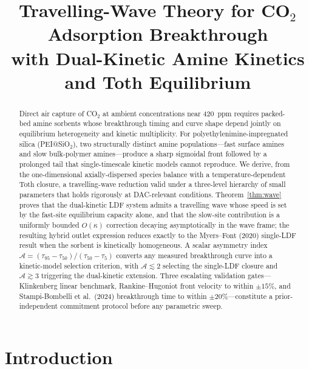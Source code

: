 \documentclass[a4paper]{amsart}
\theoremstyle{definition}
\begin{document}
\title{Travelling-Wave Theory for CO$_2$ Adsorption Breakthrough\\
with Dual-Kinetic Amine Kinetics and Toth Equilibrium}

\date{}
\maketitle

\begin{abstract}
Direct air capture of CO$_2$ at ambient concentrations near 420~ppm requires
packed-bed amine sorbents whose breakthrough timing and curve shape depend
jointly on equilibrium heterogeneity and kinetic multiplicity.
For polyethylenimine-impregnated silica (PEI@SiO$_2$), two structurally
distinct amine populations---fast surface amines and slow bulk-polymer
amines---produce a sharp sigmoidal front followed by a prolonged tail that
single-timescale kinetic models cannot reproduce.
We derive, from the one-dimensional axially-dispersed species balance with a
temperature-dependent Toth closure, a travelling-wave reduction valid under a
three-level hierarchy of small parameters that holds rigorously at
DAC-relevant conditions.
Theorem~\ref{thm:wave} proves that the dual-kinetic LDF system admits a
travelling wave whose speed is set by the fast-site equilibrium capacity
alone, and that the slow-site contribution is a uniformly bounded
$O(\kappa)$ correction decaying asymptotically in the wave frame; the
resulting hybrid outlet expression reduces exactly to the Myers--Font (2020)
single-LDF result when the sorbent is kinetically homogeneous.
A scalar asymmetry index $\mathcal{A}=(\tau_{95}-\tau_{50})/(\tau_{50}-\tau_5)$
converts any measured breakthrough curve into a kinetic-model selection
criterion, with $\mathcal{A}\lesssim 2$ selecting the single-LDF closure
and $\mathcal{A}\gtrsim 3$ triggering the dual-kinetic extension.
Three escalating validation gates---Klinkenberg linear benchmark, Rankine--Hugoniot
front velocity to within $\pm15\%$, and Stampi-Bombelli et al.\ (2024)
breakthrough time to within $\pm20\%$---constitute a prior-independent
commitment protocol before any parametric sweep.
\end{abstract}

\section{Introduction}
\end{document}
